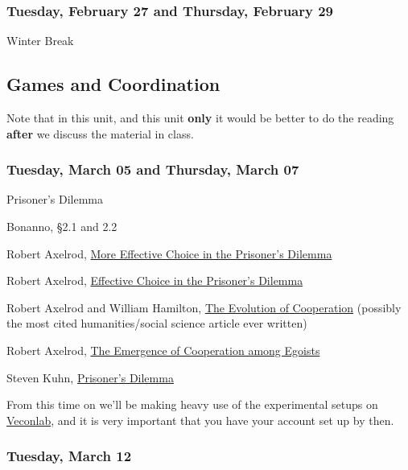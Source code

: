\documentclass[
  12pt,
  letterpaper,
  DIV=11,
  numbers=noendperiod]{scrartcl}
\providecommand{\tightlist}{%
  \setlength{\itemsep}{0pt}\setlength{\parskip}{0pt}}\usepackage{longtable,booktabs,array}
\begin{document}
\subsubsection{Tuesday, February 27 and Thursday, February
29}\label{tuesday-february-27-and-thursday-february-29}

Winter Break

\subsection{Games and Coordination}\label{games-and-coordination}

Note that in this unit, and this unit \textbf{only} it would be better
to do the reading \textbf{after} we discuss the material in class.

\subsubsection{Tuesday, March 05 and Thursday, March
07}\label{tuesday-march-05-and-thursday-march-07}

\begin{description}
\tightlist
\item[Topic]
Prisoner's Dilemma
\item[Reading]
Bonanno, §2.1 and 2.2

Robert Axelrod, \href{https://www.jstor.org/stable/173638}{More
Effective Choice in the Prisoner's Dilemma}
\item[Recommended]
Robert Axelrod, \href{https://www.jstor.org/stable/173932}{Effective
Choice in the Prisoner's Dilemma}

Robert Axelrod and William Hamilton,
\href{https://www.jstor.org/stable/1685895}{The Evolution of
Cooperation} (possibly the most cited humanities/social science article
ever written)

Robert Axelrod, \href{https://www.jstor.org/stable/1961366}{The
Emergence of Cooperation among Egoists}

Steven Kuhn,
\href{https://plato.stanford.edu/entries/prisoner-dilemma/}{Prisoner's
Dilemma}
\item[Interaction]
From this time on we'll be making heavy use of the experimental setups
on \href{https://veconlab.econ.virginia.edu/}{Veconlab}, and it is very
important that you have your account set up by then.
\end{description}

\subsubsection{Tuesday, March 12}\label{tuesday-march-12}
\end{document}

